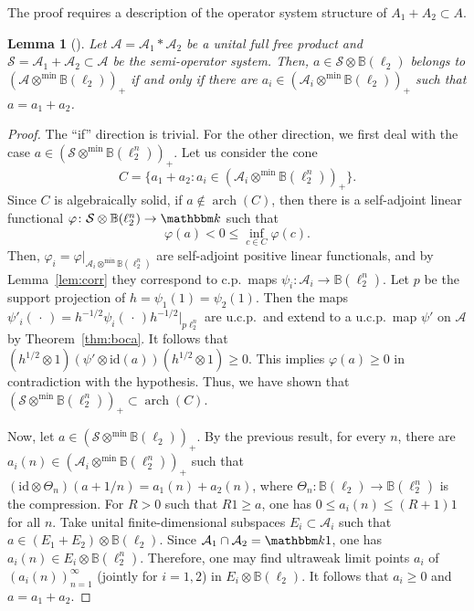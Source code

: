 \documentclass[12pt]{amsart}
\newtheorem{lem}[thm]{Lemma}
\theoremstyle{definition}
\begin{document}
The proof requires a description of the operator system structure of
$A_1+A_2\subset A$.
\begin{lem}[\cite{kavruk}]\label{lem:kavruk}
Let ${{\mathcal A}}={{\mathcal A}}_1*{{\mathcal A}}_2$ be a unital full free product and
${{\mathcal S}}={{\mathcal A}}_1+{{\mathcal A}}_2\subset {{\mathcal A}}$ be the semi-operator system.
Then, $a\in {{\mathcal S}}\otimes{{\mathbb B}}(\ell_2)$ belongs to $({{\mathcal A}}\otimes^{\min}{{\mathbb B}}(\ell_2))_+$
if and only if there are $a_i\in ({{\mathcal A}}_i\otimes^{\min}{{\mathbb B}}(\ell_2))_+$ such that
$a=a_1+a_2$.
\end{lem}
\begin{proof}
The ``if'' direction is trivial. For the other direction,
we first deal with the case $a \in ({{\mathcal S}}\otimes^{\min}{{\mathbb B}}(\ell_2^n))_+$.
Let us consider the cone
\[
C=\{ a_1 + a_2 : a_i\in ({{\mathcal A}}_i\otimes^{\min}{{\mathbb B}}(\ell_2^n))_+ \}.
\]
Since $C$ is algebraically solid, if $a\notin\operatorname*{arch}(C)$, then there is a
self-adjoint linear functional
${\varphi}\colon {{\mathcal S}}\otimes{{\mathbb B}}(\ell_2^n)\to{{\mathbbm k}}$ such that
\[
{\varphi}(a)< 0 \le \inf_{c\in C}{\varphi}(c).
\]
Then, ${\varphi}_i={\varphi}|_{{{\mathcal A}}_i\otimes^{\min}{{\mathbb B}}(\ell_2^n)}$ are self-adjoint positive linear functionals,
and by Lemma~\ref{lem:corr} they correspond to c.p.\ maps $\psi_i\colon {{\mathcal A}}_i\to{{\mathbb B}}(\ell_2^n)$.
Let $p$ be the support projection of $h=\psi_1(1)=\psi_2(1)$.
Then the maps $\psi'_i(\,\cdot\,)=h^{-1/2}\psi_i(\,\cdot\,)h^{-1/2}|_{p\ell_2^n}$
are u.c.p.\ and extend to a u.c.p.\ map $\psi'$ on ${{\mathcal A}}$ by Theorem~\ref{thm:boca}.
It follows that $(h^{1/2}\otimes 1)(\psi'\otimes{\mathrm{id}}(a))(h^{1/2}\otimes1)\geq0$.
This implies ${\varphi}(a)\geq0$ in contradiction with the hypothesis.
Thus, we have shown that $({{\mathcal S}}\otimes^{\min}{{\mathbb B}}(\ell_2^n))_+\subset\operatorname*{arch}(C)$.

Now, let $a \in ({{\mathcal S}}\otimes^{\min}{{\mathbb B}}(\ell_2))_+$.
By the previous result, for every $n$, there are $a_i(n)\in({{\mathcal A}}_i\otimes^{\min}{{\mathbb B}}(\ell_2^n))_+$
such that $({\mathrm{id}}\otimes\Theta_n)(a+1/n)=a_1(n)+a_2(n)$, where
$\Theta_n\colon{{\mathbb B}}(\ell_2)\to{{\mathbb B}}(\ell_2^n)$ is the compression.
For $R>0$ such that $R1\geq a$, one has $0\le a_i(n) \le (R+1)1$ for all $n$.
Take unital finite-dimensional subspaces $E_i\subset{{\mathcal A}}_i$ such that
$a\in (E_1+E_2)\otimes {{\mathbb B}}(\ell_2)$.
Since ${{\mathcal A}}_1\cap{{\mathcal A}}_2={{\mathbbm k}}1$, one has $a_i(n)\in E_i\otimes{{\mathbb B}}(\ell_2^n)$.
Therefore, one may find ultraweak limit points $a_i$ of $(a_i(n))_{n=1}^\infty$
(jointly for $i=1,2$) in $E_i\otimes{{\mathbb B}}(\ell_2)$.
It follows that $a_i\geq0$ and $a=a_1+a_2$.
\end{proof}
\end{document}
